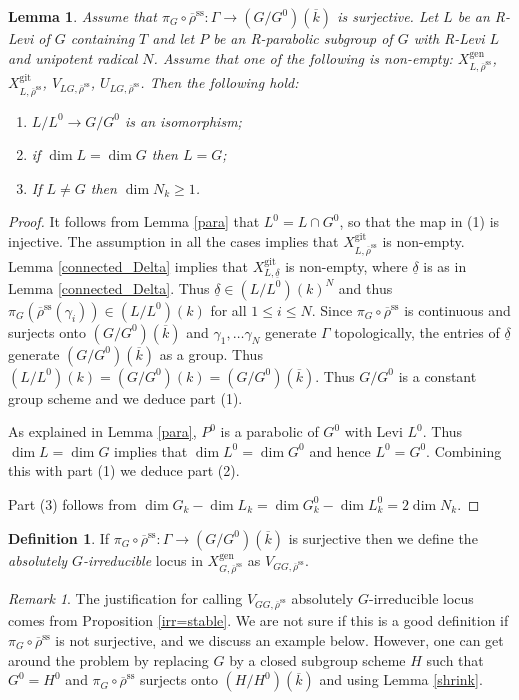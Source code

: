 \documentclass{amsart}
\newtheorem{lem}[prop]{Lemma}
\theoremstyle{definition}
\newtheorem{defi}[prop]{Definition}
\theoremstyle{remark}
\newtheorem{remar}[prop]{Remark}
\newcommand{\rhobar}{\overline{\rho}}
\newcommand{\gen}{\mathrm{gen}}
\newcommand{\gps}{\mathrm{git}}
\newcommand{\kbar}{\overline{k}}
\newcommand{\rhobarss}{\rhobar^{\mathrm{ss}}}
\begin{document}
 \begin{lem}\label{V_LG_maxdim} Assume that $\pi_G\circ \rhobarss: \Gamma \rightarrow (G/G^0)(\kbar)$ is surjective. 
Let $L$ be an R-Levi of $G$ containing $T$ and let $P$ be an R-parabolic subgroup of $G$ with 
R-Levi $L$ and unipotent radical $N$. 
Assume that one of the following is non-empty: 
$X^{\gen}_{L, \rhobarss}$, $X^{\gps}_{L, \rhobarss}$, $V_{LG, \rhobarss}$, $U_{LG, \rhobarss}$. 
Then the following hold:
\begin{enumerate} 
\item $L/L^0\rightarrow G/G^0$ is an isomorphism;
\item if $\dim L=\dim G$ then $L=G$;
\item If $L\neq G$ then $\dim  N_k\ge 1$.
\end{enumerate} 
\end{lem}
\begin{proof} It follows from Lemma \ref{para} that $L^0= L\cap G^0$, so that the map in (1) is injective. The assumption in all the cases implies that $X^{\gps}_{L, \rhobarss}$ is non-empty. Lemma \ref{connected_Delta} implies that
$X^{\gps}_{L, \underline{\delta}}$ is non-empty, where $\underline{\delta}$ is as in Lemma 
\ref{connected_Delta}. Thus $\underline{\delta}\in (L/L^0)(k)^N$ and thus 
$\pi_G(\rhobarss(\gamma_i))\in (L/L^0)(k)$
for all $1\le i \le N$. Since $\pi_G\circ \rhobarss$ is continuous and surjects onto $(G/G^0)(\kbar)$ and $\gamma_1, \ldots \gamma_N$ generate
$\Gamma$ topologically, the entries of $\underline{\delta}$ generate $(G/G^0)(\kbar)$ as a group. Thus 
$(L/L^0)(k)=(G/G^0)(k)=(G/G^0)(\kbar)$. Thus $G/G^0$ is a constant group scheme and 
 we deduce part (1).

As explained in Lemma \ref{para},  $P^0$ is a parabolic of $G^0$
with Levi $L^0$. Thus $\dim L=\dim G$ implies that $\dim L^0= \dim G^0$ and hence $L^0=G^0$.
Combining this with part (1) we deduce part (2). 

Part (3) follows from  $\dim G_k - \dim L_k= \dim G_k^0 - \dim L_k^0 = 2 \dim N_k$. 
\end{proof} 

\begin{defi}\label{defi_abs_irr} If $\pi_G\circ \rhobarss: \Gamma \rightarrow (G/G^0)(\kbar)$ is surjective then we define 
the \emph{absolutely $G$-irreducible} locus in $X^{\gen}_{G, \rhobarss}$ as $V_{GG,\rhobarss}$. 
\end{defi}

\begin{remar}\label{rem_bad_def} The justification for calling $V_{GG,\rhobarss}$ absolutely $G$-irreducible locus comes 
from Proposition \ref{irr=stable}. We are not sure if this is a good definition if $\pi_G\circ 
\rhobarss$ is not surjective, and we discuss an example below. However, one can get around the problem by replacing $G$ by a closed subgroup scheme
$H$ such that $G^0=H^0$ and $\pi_G\circ \rhobarss$ surjects onto $(H/H^0)(\kbar)$ and using Lemma \ref{shrink}.
\end{remar}
\end{document}
